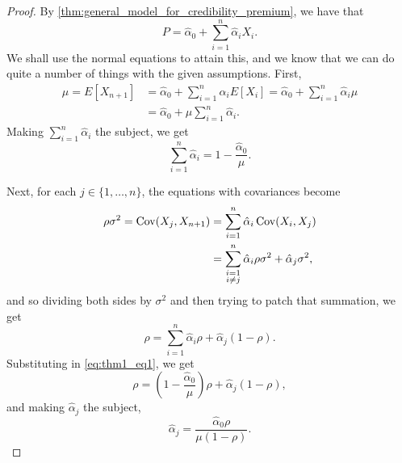 \documentclass[notoc,notitlepage]{tufte-book}
\begin{document}
\begin{proof}
  By \cref{thm:general_model_for_credibility_premium}, we have that
  \begin{equation*}
    P = \hat{\alpha}_0 + \sum_{i=1}^{n} \hat{\alpha}_i X_i.
  \end{equation*}
  We shall use the normal equations to attain this, and we know that we can do
  quite a number of things with the given assumptions. First,
  \begin{align*}
    \mu = E[X_{n+1}] &= \hat{\alpha}_0 + \sum_{i=1}^{n} \hat{\alpha}_i E[X_i]
                      = \hat{\alpha}_0 + \sum_{i=1}^{n} \hat{\alpha}_i \mu \\
                     &= \hat{\alpha}_0 + \mu \sum_{i=1}^{n} \hat{\alpha}_i.
  \end{align*}
  Making $\sum_{i=1}^{n} \hat{\alpha}_i$ the subject, we get
  \begin{equation}\label{eq:thm1_eq1}
    \sum_{i=1}^{n} \hat{\alpha}_i = 1 - \frac{\hat{\alpha}_0}{\mu}.
  \end{equation}

  Next, for each $j \in \{ 1, \ldots, n \}$, the equations with covariances
  become
  \begin{align*}
    \rho \sigma^2 = \operatorname{Cov}(X_j, X_{n+1})
                  &= \sum_{i=1}^{n} \hat{\alpha}_i \operatorname{Cov}(X_i, X_j) \\
                  &= \sum_{\substack{i=1 \\ i \neq j}}^{n} \hat{\alpha}_i \rho
                    \sigma^2 + \hat{\alpha}_j \sigma^2,
  \end{align*}
  and so dividing both sides by $\sigma^2$ and then trying to patch that
  summation, we get
  \begin{equation*}
    \rho = \sum_{i=1}^{n} \hat{\alpha}_i \rho + \hat{\alpha}_j ( 1 - \rho ).
  \end{equation*}
  Substituting in \cref{eq:thm1_eq1}, we get
  \begin{equation*}
    \rho = \left( 1 - \frac{\hat{\alpha}_0}{\mu} \right) \rho + \hat{\alpha}_j
    (1 - \rho),
  \end{equation*}
  and making $\hat{\alpha}_j$ the subject,
  \begin{equation*}
    \hat{\alpha}_j = \frac{\hat{\alpha}_0 \rho}{\mu (1 - \rho)}.
  \end{equation*}


\end{proof}
\end{document}

